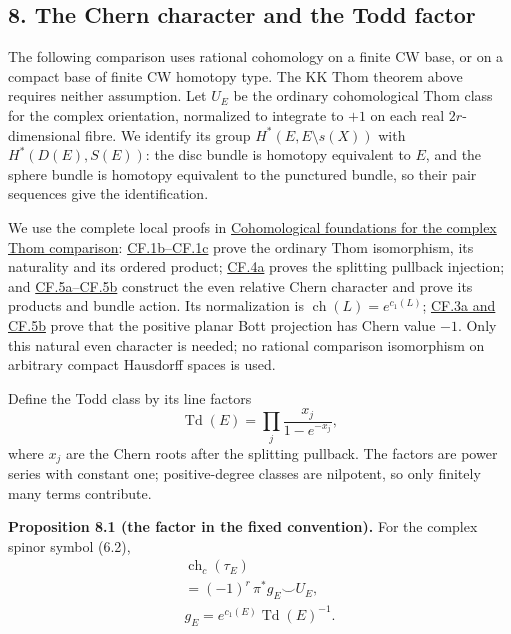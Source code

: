 \documentclass[
  11pt,
]{article}
\begin{document}
\subsection{8. The Chern character and the Todd
factor}\label{the-chern-character-and-the-todd-factor}

The following comparison uses rational cohomology on a finite CW base,
or on a compact base of finite CW homotopy type. The KK Thom theorem
above requires neither assumption. Let \(U_E\) be the ordinary
cohomological Thom class for the complex orientation, normalized to
integrate to \(+1\) on each real \(2r\)-dimensional fibre. We identify
its group \(H^*(E,E\setminus s(X))\) with \(H^*(D(E),S(E))\): the disc
bundle is homotopy equivalent to \(E\), and the sphere bundle is
homotopy equivalent to the punctured bundle, so their pair sequences
give the identification.

We use the complete local proofs in
\href{supporting/cohomological-foundations/cohomological-foundations.html}{Cohomological
foundations for the complex Thom comparison}:
\href{supporting/cohomological-foundations/cohomological-foundations.html\#cf-thom}{CF.1b--CF.1c}
prove the ordinary Thom isomorphism, its naturality and its ordered
product;
\href{supporting/cohomological-foundations/cohomological-foundations.html\#cf-splitting}{CF.4a}
proves the splitting pullback injection; and
\href{supporting/cohomological-foundations/cohomological-foundations.html\#cf-character}{CF.5a--CF.5b}
construct the even relative Chern character and prove its products and
bundle action. Its normalization is \(\operatorname{ch}(L)=e^{c_1(L)}\);
\href{supporting/cohomological-foundations/cohomological-foundations.html\#cf-projective-space}{CF.3a
and CF.5b} prove that the positive planar Bott projection has Chern
value \(-1\). Only this natural even character is needed; no rational
comparison isomorphism on arbitrary compact Hausdorff spaces is used.

Define the Todd class by its line factors \[
\operatorname{Td}(E)=\prod_j\frac{x_j}{1-e^{-x_j}},
\tag{8.1}
\] where \(x_j\) are the Chern roots after the splitting pullback. The
factors are power series with constant one; positive-degree classes are
nilpotent, so only finitely many terms contribute.

\textbf{Proposition 8.1 (the factor in the fixed convention).} For the
complex spinor symbol (6.2), \[
\begin{gathered}
\operatorname{ch}_c(\tau_E)\\
 =(-1)^r\,\pi^*g_E\smile U_E,\\
g_E=e^{c_1(E)}\operatorname{Td}(E)^{-1}.
\end{gathered}
\tag{8.2}
\]
\end{document}
